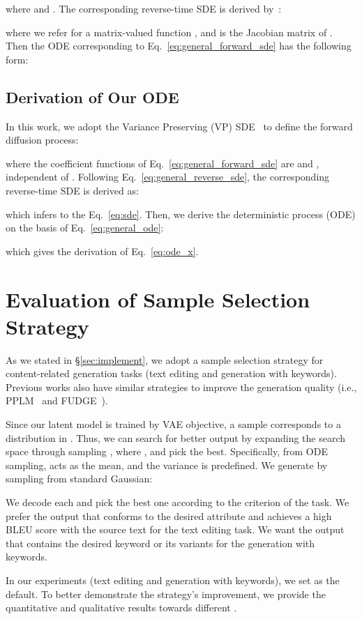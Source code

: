 \documentclass[11pt]{article}
\begin{document}
where  and . The corresponding reverse-time SDE is derived by~\citet{anderson1982reverse}:

where we refer  for a matrix-valued function , and  is the Jacobian matrix of .
Then the ODE corresponding to Eq.~\ref{eq:general_forward_sde} has the following form:

\subsection{Derivation of Our ODE}
In this work, we adopt the Variance Preserving (VP) SDE~\cite{DBLP:conf/iclr/0011SKKEP21} to define the forward diffusion process:

where the coefficient functions of Eq.~\ref{eq:general_forward_sde} are  and , independent of . Following Eq.~\ref{eq:general_reverse_sde}, the corresponding reverse-time SDE is derived as:

which infers to the Eq.~\ref{eq:sde}. Then, we derive the deterministic process (ODE) on the basis of Eq.~\ref{eq:general_ode}:

which gives the derivation of Eq.~\ref{eq:ode_x}.
\newpage
\section{Evaluation of Sample Selection Strategy}
\label{app:sample_selection}
As we stated in \S\ref{sec:implement}, we adopt a sample selection strategy for content-related generation tasks (text editing and generation with keywords).
Previous works also have similar strategies to improve the generation quality (i.e., PPLM~\cite{Dathathri2020Plug} and FUDGE~\cite{DBLP:journals/corr/abs-2104-05218}).

Since our latent model is trained by VAE objective, a sample  corresponds to a distribution  in . Thus, we can search for better output by expanding the search space through sampling , where , and pick the best. 
Specifically, from ODE sampling,  acts as the mean, and the variance  is predefined. We generate  by sampling  from standard Gaussian:


We decode each  and pick the best one according to the criterion of the task. We prefer the output that conforms to the desired attribute and achieves a high BLEU score with the source text for the text editing task. We want the output that contains the desired keyword or its variants for the generation with keywords. 

In our experiments (text editing and generation with keywords), we set  as the default. To better demonstrate the strategy's improvement, we provide the quantitative and qualitative results towards different .
\end{document}
